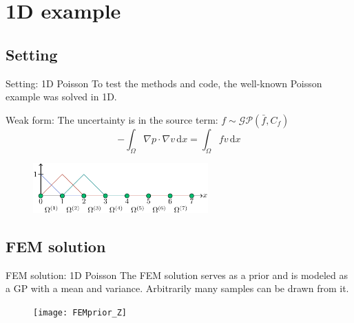 \documentclass[fleqn,11pt,aspectratio=43]{beamer}
\begin{document}
\section{1D example}
\subsection{Setting}

\begin{frame}{Setting: 1D Poisson}
To test the methods and code, the well-known Poisson example was solved in 1D.
\begin{block}{Weak form:}
The uncertainty is in the source term: $f \sim \mathcal{GP}(\bar{f}, C_f)$
\begin{equation}
-\int_{\Omega} \nabla p \cdot \nabla v \,\mathrm{d}x = \int_{\Omega} fv \,\mathrm{d}x
\end{equation}
\end{block}
      	\begin{figure}[h]
		\begin{center}
		\includegraphics[width=0.6\textwidth]{1dDomain}
		\end{center}
		\end{figure}

\end{frame}


\subsection{FEM solution}
\begin{frame}{FEM solution: 1D Poisson}
The FEM solution serves as a prior and is modeled as a GP with a mean and variance. Arbitrarily many samples can be drawn from it.
      	\begin{figure}[h]
		\begin{center}
		\texttt{[image: FEMprior\_Z]}
		\end{center}
		\end{figure}

\end{frame}
\end{document}
